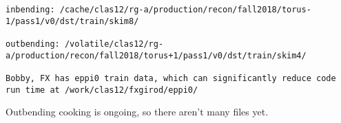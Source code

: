 
\begin{lstlisting}
inbending: /cache/clas12/rg-a/production/recon/fall2018/torus-1/pass1/v0/dst/train/skim8/

outbending: /volatile/clas12/rg-a/production/recon/fall2018/torus+1/pass1/v0/dst/train/skim4/

Bobby, FX has eppi0 train data, which can significantly reduce code run time at /work/clas12/fxgirod/eppi0/

\end{lstlisting}

Outbending cooking is ongoing, so there aren’t many files yet.